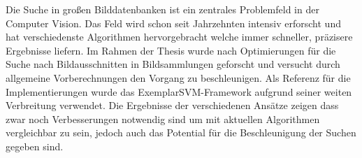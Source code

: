 Die Suche in großen Bilddatenbanken ist ein zentrales Problemfeld in der Computer Vision. Das Feld wird schon seit Jahrzehnten intensiv erforscht und hat verschiedenste Algorithmen hervorgebracht welche immer schneller, präzisere Ergebnisse liefern. Im Rahmen der Thesis wurde nach Optimierungen für die Suche nach Bildausschnitten in Bildsammlungen geforscht und versucht durch allgemeine Vorberechnungen den Vorgang zu beschleunigen. Als Referenz für die Implementierungen wurde das ExemplarSVM-Framework \cite{Malisiewicz2011} aufgrund seiner weiten Verbreitung verwendet. Die Ergebnisse der verschiedenen Ansätze zeigen dass zwar noch Verbesserungen notwendig sind um mit aktuellen Algorithmen vergleichbar zu sein, jedoch auch das Potential für die Beschleunigung der Suchen gegeben sind.